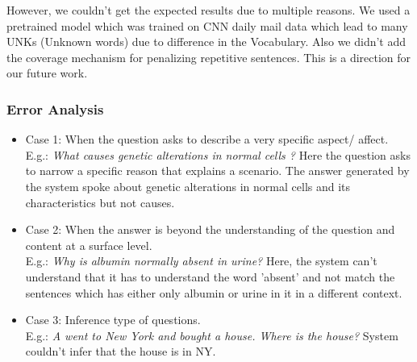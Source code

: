 However, we couldn't get the expected results due to multiple reasons. We used a pretrained model which was trained on CNN daily mail data which lead to many UNKs (Unknown words) due to difference in the Vocabulary. Also we didn't add the coverage mechanism for penalizing repetitive sentences. This is a direction for our future work.

\subsubsection{Error Analysis}
\begin{itemize}
    \item Case 1: When the question asks to describe a very specific aspect/ affect. \\
    E.g.: \textit{What causes genetic alterations in normal cells ?}
    Here the question asks to narrow a specific reason that explains a scenario. The answer generated by the system spoke about genetic alterations in normal cells and its characteristics but not causes.
    \item Case 2: When the answer is beyond the understanding of the question and content at a surface level. \\
    E.g.: \textit{Why is albumin normally absent in urine?} Here, the system can't understand that it has to understand the word 'absent' and not match the sentences which has either only albumin or urine in it in a different context.  
    \item Case 3: Inference type of questions. \\
    E.g.: \textit{A went to New York and bought a house. Where is the house?}
    System couldn't infer that the house is in NY.
\end{itemize}